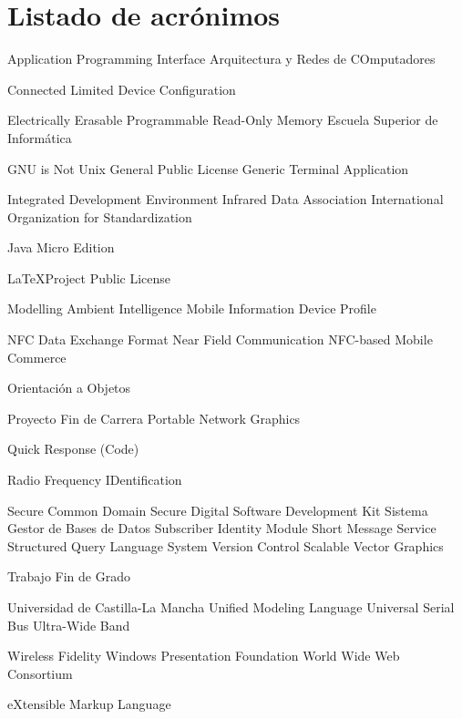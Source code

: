 
\chapter{Listado de acrónimos}

{\small
\begin{acronym}[XXXXXXXX]
       {Application Programming Interface}
      {Arquitectura y Redes de COmputadores}

      {Connected Limited Device Configuration}

    {Electrically Erasable Programmable Read-Only Memory}
       {Escuela Superior de Informática}

       {GNU is Not Unix}
       {General Public License}
       {Generic Terminal Application}

       {Integrated Development Environment}
      {Infrared Data Association}
       {International Organization for Standardization}

    {Java Micro Edition}

      {\LaTeX Project Public License}

      {Modelling Ambient Intelligence}
      {Mobile Information Device Profile}

      {NFC Data Exchange Format}
       {Near Field Communication}
       {NFC-based Mobile Commerce}

        {Orientación a Objetos}

       {Proyecto Fin de Carrera}
       {Portable Network Graphics}
  
        {Quick Response (Code)}

      {Radio Frequency IDentification}

       {Secure Common Domain}
        {Secure Digital}
       {Software Development Kit}
      {Sistema Gestor de Bases de Datos}
       {Subscriber Identity Module}
       {Short Message Service}
       {Structured Query Language}
       {System Version Control}
       {Scalable Vector Graphics}

       {Trabajo Fin de Grado}

      {Universidad de Castilla-La Mancha}
       {Unified Modeling Language}
       {Universal Serial Bus}
       {Ultra-Wide Band}

      {Wireless Fidelity}
       {Windows Presentation Foundation}
       {World Wide Web Consortium}

       {eXtensible Markup Language}
\end{acronym}
}


